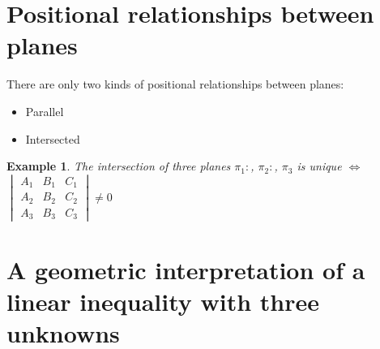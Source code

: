 \documentclass[onecolumn]{ctexart}
\newtheorem{example}{Example}
\begin{document}
\section{Positional relationships between planes}
There are only two kinds of positional relationships between planes:
\begin{itemize}
  \item Parallel
  \item Intersected
\end{itemize}

\begin{example}
  The intersection of three planes $\pi_1: $, $\pi_2: $, $\pi_3$ is unique $\Leftrightarrow$
  $\begin{vmatrix}
    A_1 & B_1 & C_1 \\
    A_2 & B_2 & C_2 \\
    A_3 & B_3 & C_3
  \end{vmatrix} \neq 0$
\end{example}

\section{A geometric interpretation of a linear inequality with three unknowns}
\end{document}
